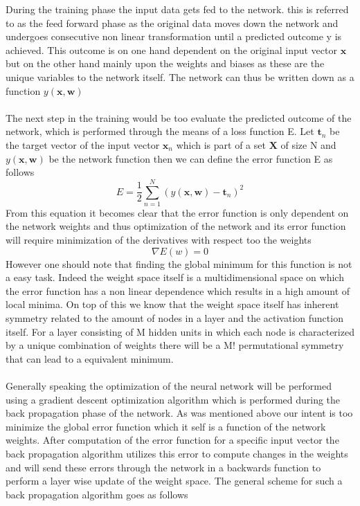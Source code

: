 \documentclass[]{article}
\begin{document}
During the training phase the input data gets fed to the network. this is referred to as the feed forward phase as the original data moves down the network and undergoes consecutive non linear transformation until a predicted outcome y is achieved. This outcome is on one hand dependent on the original input vector $\textbf{x}$ but on the other hand mainly upon the weights and biases as these are the unique variables to the network itself. The network can thus be written down as a function $y(\textbf{x}, \textbf{w})$
\\
\\
The next step in the training would be too evaluate the predicted outcome of the network, which is performed through the means of a loss function E. Let $\textbf{t}_n$ be the target vector of the input vector $\textbf{x}_n$ which is part of a set $\textbf{X}$ of size N and $y(\textbf{x}, \textbf{w})$ be the network function then we can define the error function E as follows
\begin{equation*}
	E = \frac{1}{2} \sum_{n=1}^{N} \left(y(\textbf{x}, \textbf{w}) - \textbf{t}_n\right)^2
\end{equation*}
From this equation it becomes clear that the error function is only dependent on the network weights and thus optimization of the network and its error function will require minimization of the derivatives with respect too the weights
\begin{equation*}
	\nabla E(w) = 0
\end{equation*}
However one should note that finding the global minimum for this function is not a easy task. Indeed the weight space itself is a multidimensional space on which the error function has a non linear dependence which results in a high amount of local minima. On top of this we know that the weight space itself has inherent symmetry related to the amount of nodes in a layer and the activation function itself. For a layer consisting of M hidden units in which each node is characterized by a unique combination of weights there will be a M! permutational symmetry that can lead to a equivalent minimum.
\\
\\
Generally speaking the optimization of the neural network will be performed using a gradient descent optimization algorithm which is performed during the back propagation phase of the network. As was mentioned above our intent is too minimize the global error function which it self is a function of the network weights. After computation of the error function for a specific input vector the back propagation algorithm utilizes this error to compute changes in the weights and will send these errors through the network in a backwards function to perform a layer wise update of the weight space. The general scheme for such a back propagation algorithm goes as follows
\end{document}
